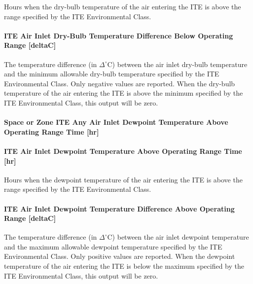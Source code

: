 Hours when the dry-bulb temperature of the air entering the ITE is above the range specified by the ITE Environmental Class.

\paragraph{ITE Air Inlet Dry-Bulb Temperature Difference Below Operating Range {[}deltaC{]}}\label{ite-air-inlet-dry-bulb-temperature-difference-below-operating-range-deltac}

The temperature difference (in $\Delta^{\circ}$C) between the air inlet dry-bulb temperature and the minimum allowable dry-bulb temperature specified by the ITE Environmental Class. Only negative values are reported. When the dry-bulb temperature of the air entering the ITE is above the minimum specified by the ITE Environmental Class, this output will be zero.

\paragraph{Space or Zone ITE Any Air Inlet Dewpoint Temperature Above Operating Range Time {[}hr{]}}\label{zone-ite-any-air-inlet-dewpoint-temperature-above-operating-range-time-hr}

\paragraph{ITE Air Inlet Dewpoint Temperature Above Operating Range Time {[}hr{]}}\label{ite-air-inlet-dewpoint-temperature-above-operating-range-time-hr}

Hours when the dewpoint temperature of the air entering the ITE is above the range specified by the ITE Environmental Class.

\paragraph{ITE Air Inlet Dewpoint Temperature Difference Above Operating Range {[}deltaC{]}}\label{ite-air-inlet-dewpoint-temperature-difference-above-operating-range-deltac}

The temperature difference (in $\Delta^{\circ}$C) between the air inlet dewpoint temperature and the maximum allowable dewpoint temperature specified by the ITE Environmental Class. Only positive values are reported. When the dewpoint temperature of the air entering the ITE is below the maximum specified by the ITE Environmental Class, this output will be zero.

